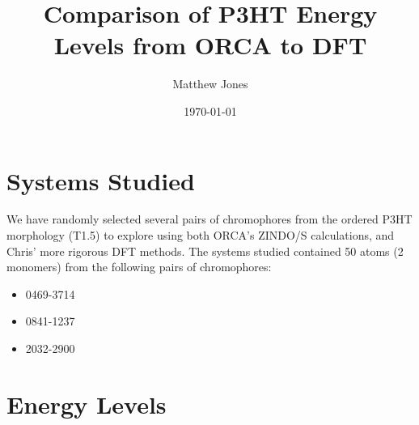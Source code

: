 \documentclass[12pt]{article}
\title{Comparison of P3HT Energy Levels from ORCA to DFT}
\author{Matthew Jones}
\date{\today}
\begin{document}
\maketitle

\section{Systems Studied}

We have randomly selected several pairs of chromophores from the ordered P3HT morphology (T1.5) to explore using both ORCA's ZINDO/S calculations, and Chris' more rigorous DFT methods.
The systems studied contained 50 atoms (2 monomers) from the following pairs of chromophores:
\begin{itemize}
    \item{0469-3714}
    \item{0841-1237}
    \item{2032-2900}
\end{itemize}

\section{Energy Levels}
\end{document}
